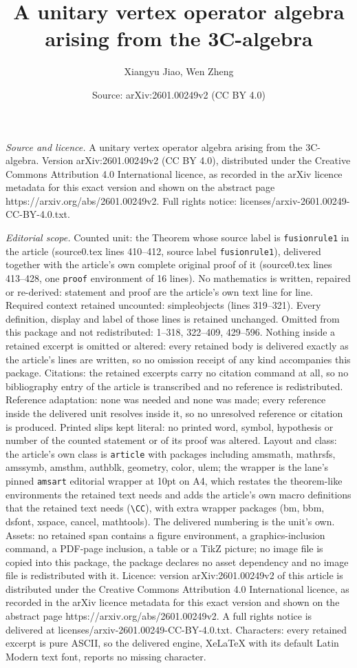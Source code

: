 \documentclass[10pt,a4paper]{amsart}
\title[A unitary vertex operator algebra arising from the 3C-algebr]{A unitary vertex operator algebra arising from the 3C-algebra}
\author{Xiangyu Jiao, Wen Zheng}
\date{Source: arXiv:2601.00249v2 (CC BY 4.0)}
\begin{document}
\maketitle

\noindent\emph{Source and licence.} A unitary vertex operator algebra arising from the 3C-algebra. Version arXiv:2601.00249v2 (CC BY 4.0), distributed under the Creative Commons Attribution 4.0 International licence, as recorded in the arXiv licence metadata for this exact version and shown on the abstract page https://arxiv.org/abs/2601.00249v2. Full rights notice: licenses/arxiv-2601.00249-CC-BY-4.0.txt.\par\smallskip

\noindent\textit{Editorial scope.} Counted unit: the Theorem whose source label is \texttt{fusionrule1} in the article (source0.tex lines 410--412, source label \texttt{fusionrule1}), delivered together with the article's own complete original proof of it (source0.tex lines 413--428, one \texttt{proof} environment of 16 lines). No mathematics is written, repaired or re-derived: statement and proof are the article's own text line for line. Required context retained uncounted: simpleobjects (lines 319--321). Every definition, display and label of those lines is retained unchanged. Omitted from this package and not redistributed: 1--318, 322--409, 429--596. Nothing inside a retained excerpt is omitted or altered: every retained body is delivered exactly as the article's lines are written, so no omission receipt of any kind accompanies this package. Citations: the retained excerpts carry no citation command at all, so no bibliography entry of the article is transcribed and no reference is redistributed. Reference adaptation: none was needed and none was made; every reference inside the delivered unit resolves inside it, so no unresolved reference or citation is produced. Printed slips kept literal: no printed word, symbol, hypothesis or number of the counted statement or of its proof was altered. Layout and class: the article's own class is \texttt{article} with packages including amsmath, mathrsfs, amssymb, amsthm, authblk, geometry, color, ulem; the wrapper is the lane's pinned \texttt{amsart} editorial wrapper at 10pt on A4, which restates the theorem-like environments the retained text needs and adds the article's own macro definitions that the retained text needs (\texttt{\textbackslash CC}), with extra wrapper packages (bm, bbm, dsfont, xspace, cancel, mathtools). The delivered numbering is the unit's own. Assets: no retained span contains a figure environment, a graphics-inclusion command, a PDF-page inclusion, a table or a TikZ picture; no image file is copied into this package, the package declares no asset dependency and no image file is redistributed with it. Licence: version arXiv:2601.00249v2 of this article is distributed under the Creative Commons Attribution 4.0 International licence, as recorded in the arXiv licence metadata for this exact version and shown on the abstract page https://arxiv.org/abs/2601.00249v2. A full rights notice is delivered at licenses/arxiv-2601.00249-CC-BY-4.0.txt. Characters: every retained excerpt is pure ASCII, so the delivered engine, XeLaTeX with its default Latin Modern text font, reports no missing character.
\end{document}
